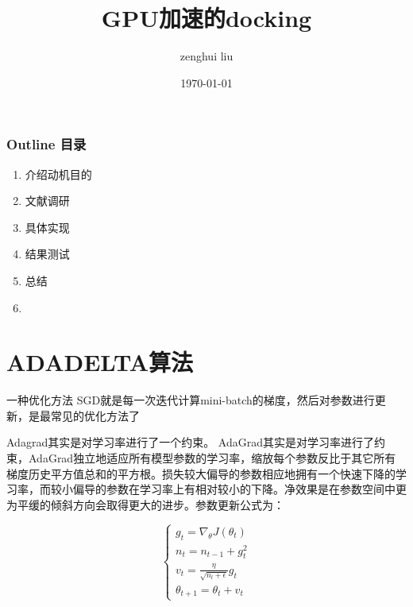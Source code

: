 \documentclass[xcolor=x11names,UTF8]{ctexbeamer}
\title[Short title]{GPU加速的docking } %
\author{zenghui liu} %
\institute[] %
{ cms\\ %

\medskip
\textit{akakcolin@163.com} %
}
\date{\today} %
\begin{document}
\maketitle

\begin{frame}
  \frametitle{\textbf{Outline 目录}}
  \begin{enumerate}
  \item 介绍动机目的
  \item 文献调研
  \item 具体实现
  \item 结果测试
  \item 总结
  \item 
\end{enumerate}
\end{frame}


\section{ADADELTA算法} %
一种优化方法
SGD就是每一次迭代计算mini-batch的梯度，然后对参数进行更新，是最常见的优化方法了

Adagrad其实是对学习率进行了一个约束。
AdaGrad其实是对学习率进行了约束，AdaGrad独立地适应所有模型参数的学习率，缩放每个参数反比于其它所有梯度历史平方值总和的平方根。损失较大偏导的参数相应地拥有一个快速下降的学习率，而较小偏导的参数在学习率上有相对较小的下降。净效果是在参数空间中更为平缓的倾斜方向会取得更大的进步。参数更新公式为：

\begin{equation}
\left\{\begin{array}{l}
g_{t}=\nabla_{\theta} J\left(\theta_{t}\right) \\
n_{t}=n_{t-1}+g_{t}^{2} \\
v_{t}=\frac{\eta}{\sqrt{n_{l}+\epsilon}} g_{t} \\
\theta_{t+1}=\theta_{t}+v_{t}
\end{array}\right.
\end{equation}
\end{document}
